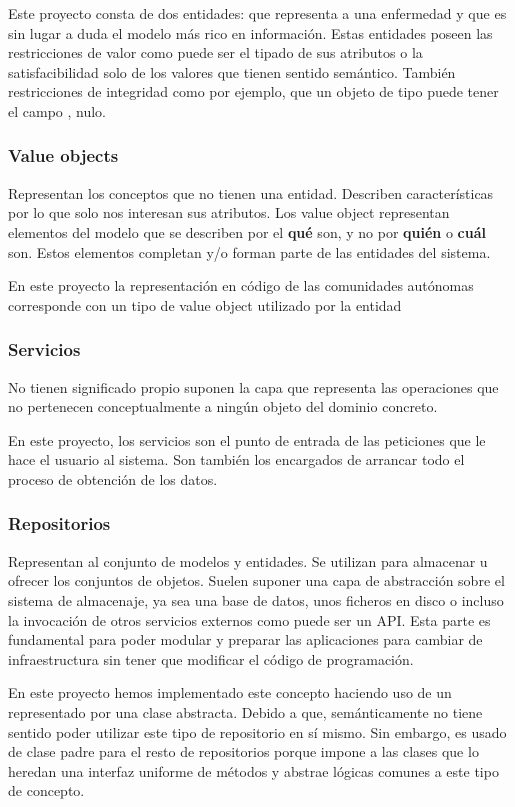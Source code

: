 Este proyecto consta de dos entidades:  que representa a una enfermedad
y  que es sin lugar a duda el modelo más rico en información. Estas
entidades poseen las restricciones de valor como puede ser el tipado de sus atributos o la
satisfacibilidad solo de los valores que tienen sentido semántico. También restricciones
de integridad como por ejemplo, que un objeto de tipo  puede tener el
campo , nulo.

\subsubsection{Value objects}
Representan los conceptos que no tienen una entidad. Describen características por lo que
solo nos interesan sus atributos. Los value object representan elementos del modelo que se
describen por el \textbf{qué} son, y no por \textbf{quién} o \textbf{cuál} son. Estos
elementos completan y/o forman parte de las entidades del sistema.

En este proyecto la representación en código de las comunidades autónomas corresponde con
un tipo de value object utilizado por la entidad 

\subsubsection{Servicios}
No tienen significado propio suponen la capa que representa las operaciones que no
pertenecen conceptualmente a ningún objeto del dominio concreto. 

En este proyecto, los servicios son el punto de entrada de las peticiones que le hace el
usuario al sistema. Son también los encargados de arrancar todo el proceso de obtención de
los datos.

\subsubsection{Repositorios}
Representan al conjunto de modelos y entidades. Se utilizan para almacenar u ofrecer los
conjuntos de objetos. Suelen suponer una capa de abstracción sobre el sistema de
almacenaje, ya sea una base de datos, unos ficheros en disco o incluso la invocación de
otros servicios externos como puede ser un API. Esta parte es fundamental para poder
modular y preparar las aplicaciones para cambiar de infraestructura sin tener que
modificar el código de programación.

En este proyecto hemos implementado este concepto haciendo uso de un
 representado por una clase abstracta. Debido a que,
semánticamente no tiene sentido poder utilizar este tipo de repositorio en sí mismo. Sin
embargo, es usado de clase padre para el resto de repositorios porque impone a las clases
que lo heredan una interfaz uniforme de métodos y abstrae lógicas comunes a este tipo de
concepto.

